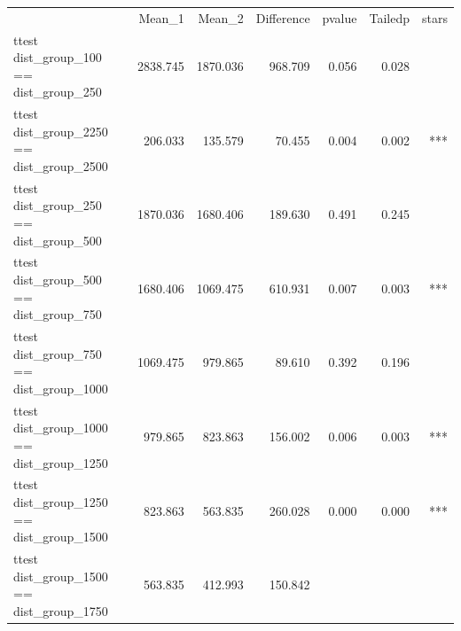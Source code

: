 \documentclass[12pt]{article}
\begin{document}
\begin{table}[!h]
\centering
\begin{tabular}{lllllll}
\cline{1-7}
\multicolumn{1}{c}{} &
  \multicolumn{1}{|r}{Mean\_1} &
  \multicolumn{1}{r}{Mean\_2} &
  \multicolumn{1}{r}{Difference} &
  \multicolumn{1}{r}{p\-value} &
  \multicolumn{1}{r}{Tailed\-p} &
  \multicolumn{1}{r}{stars} \\
\cline{1-7}
\multicolumn{1}{l}{ttest dist\_group\_100 == dist\_group\_250} &
  \multicolumn{1}{|r}{2838.745} &
  \multicolumn{1}{r}{1870.036} &
  \multicolumn{1}{r}{968.709} &
  \multicolumn{1}{r}{0.056} &
  \multicolumn{1}{r}{0.028} &
  \multicolumn{1}{r}{} \\
\multicolumn{1}{l}{ttest dist\_group\_2250 == dist\_group\_2500} &
  \multicolumn{1}{|r}{206.033} &
  \multicolumn{1}{r}{135.579} &
  \multicolumn{1}{r}{70.455} &
  \multicolumn{1}{r}{0.004} &
  \multicolumn{1}{r}{0.002} &
  \multicolumn{1}{r}{***} \\
\multicolumn{1}{l}{ttest dist\_group\_250 == dist\_group\_500} &
  \multicolumn{1}{|r}{1870.036} &
  \multicolumn{1}{r}{1680.406} &
  \multicolumn{1}{r}{189.630} &
  \multicolumn{1}{r}{0.491} &
  \multicolumn{1}{r}{0.245} &
  \multicolumn{1}{r}{} \\
\multicolumn{1}{l}{ttest dist\_group\_500 == dist\_group\_750} &
  \multicolumn{1}{|r}{1680.406} &
  \multicolumn{1}{r}{1069.475} &
  \multicolumn{1}{r}{610.931} &
  \multicolumn{1}{r}{0.007} &
  \multicolumn{1}{r}{0.003} &
  \multicolumn{1}{r}{***} \\
\multicolumn{1}{l}{ttest dist\_group\_750 == dist\_group\_1000} &
  \multicolumn{1}{|r}{1069.475} &
  \multicolumn{1}{r}{979.865} &
  \multicolumn{1}{r}{89.610} &
  \multicolumn{1}{r}{0.392} &
  \multicolumn{1}{r}{0.196} &
  \multicolumn{1}{r}{} \\
\multicolumn{1}{l}{ttest dist\_group\_1000 == dist\_group\_1250} &
  \multicolumn{1}{|r}{979.865} &
  \multicolumn{1}{r}{823.863} &
  \multicolumn{1}{r}{156.002} &
  \multicolumn{1}{r}{0.006} &
  \multicolumn{1}{r}{0.003} &
  \multicolumn{1}{r}{***} \\
\multicolumn{1}{l}{ttest dist\_group\_1250 == dist\_group\_1500} &
  \multicolumn{1}{|r}{823.863} &
  \multicolumn{1}{r}{563.835} &
  \multicolumn{1}{r}{260.028} &
  \multicolumn{1}{r}{0.000} &
  \multicolumn{1}{r}{0.000} &
  \multicolumn{1}{r}{***} \\
\multicolumn{1}{l}{ttest dist\_group\_1500 == dist\_group\_1750} &
  \multicolumn{1}{|r}{563.835} &
  \multicolumn{1}{r}{412.993} &
  \multicolumn{1}{r}{150.842} &

\end{tabular}
\end{table}
\end{document}
